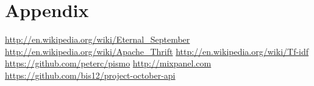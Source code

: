 \documentclass[11pt,letterpaper]{article}
\begin{document}
\section{Appendix}

\newpage
\newpage
\begin{thebibliography}{6}
   \url{http://en.wikipedia.org/wiki/Eternal\_September}
   \url{http://en.wikipedia.org/wiki/Apache\_Thrift}
   \url{http://en.wikipedia.org/wiki/Tf-idf}
   \url{https://github.com/peterc/pismo}
   \url{http://mixpanel.com}
   \url{https://github.com/bis12/project-october-api}
\end{thebibliography}

\newpage
\appendix
\end{document}
